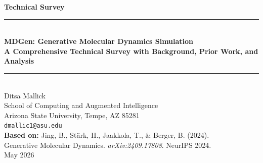 \documentclass[11pt,a4paper]{article}
\begin{document}

\begin{titlepage}
  \centering
  \vspace*{2cm}

  {\Large\bfseries\color{teal} Technical Survey}\\[0.4em]
  \rule{\textwidth}{1pt}\\[0.6em]

  {\LARGE\bfseries\color{ink}
    MDGen: Generative Molecular Dynamics Simulation\\
    \large A Comprehensive Technical Survey with Background, Prior Work, and Analysis}\\[0.6em]

  \rule{\textwidth}{1pt}\\[1.5cm]

  {\large Ditsa Mallick}\\[0.3em]
  {\normalsize School of Computing and Augmented Intelligence\\
   Arizona State University, Tempe, AZ 85281}\\[0.2em]
  {\normalsize \texttt{dmallic1@asu.edu}}\\[1.5cm]

  {\normalsize
    \textbf{Based on:} Jing, B., St\"{a}rk, H., Jaakkola, T., \& Berger, B. (2024).\\
    Generative Molecular Dynamics. \textit{arXiv:2409.17808}. NeurIPS 2024.}\\[1cm]

  {\normalsize May 2026}\\[2cm]


\end{titlepage}
\end{document}
